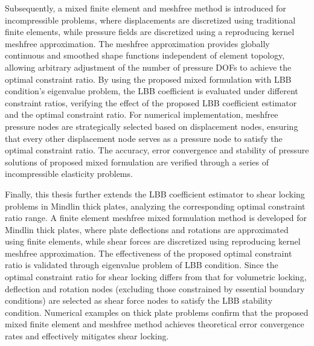 \begin{abstractEn}
    Subsequently, a mixed finite element and meshfree method is introduced for incompressible problems, where displacements are discretized using traditional finite elements, while pressure fields are discretized using a reproducing kernel meshfree approximation.
    The meshfree approximation provides globally continuous and smoothed shape functions independent of element topology, allowing arbitrary adjustment of the number of pressure DOFs to achieve the optimal constraint ratio.
    By using the proposed mixed formulation with LBB condition's eigenvalue problem, the LBB coefficient is evaluated under different constraint ratios, verifying the effect of the proposed LBB coefficient estimator and the optimal constraint ratio.
    For numerical implementation, meshfree pressure nodes are strategically selected based on displacement nodes, ensuring that every other displacement node serves as a pressure node to satisfy the optimal constraint ratio.
    The accuracy, error convergence and stability of pressure solutions of proposed mixed formulation are verified through a series of incompressible elasticity problems.
    
    Finally, this thesis further extends the LBB coefficient estimator to shear locking problems in Mindlin thick plates, analyzing the corresponding optimal constraint ratio range.
    A finite element meshfree mixed formulation method is developed for Mindlin thick plates, where plate deflections and rotations are approximated using finite elements, while shear forces are discretized using reproducing kernel meshfree approximation.
    The effectiveness of the proposed optimal constraint ratio is validated through eigenvalue problem of LBB condition.
    Since the optimal constraint ratio for shear locking differs from that for volumetric locking, deflection and rotation nodes (excluding those constrained by essential boundary conditions) are selected as shear force nodes to satisfy the LBB stability condition.
    Numerical examples on thick plate problems confirm that the proposed mixed finite element and meshfree method achieves theoretical error convergence rates and effectively mitigates shear locking.
    
    \end{abstractEn}
    